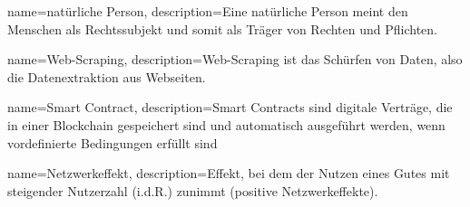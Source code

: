 {
name={natürliche Person},
description={\glqq Eine natürliche Person meint den Menschen als Rechtssubjekt und somit als Träger von Rechten und Pflichten.\grqq{} \cite{NatPerson_2018}}
}

{
name={Web-Scraping},
description={\glqq Web-Scraping ist das Schürfen von Daten, also die Datenextraktion aus Webseiten.\grqq{} \cite{webScraping_2021}}
}

{
name={Smart Contract},
description={\glqq Smart Contracts sind digitale Verträge, die in einer Blockchain gespeichert sind und automatisch ausgeführt werden, wenn vordefinierte Bedingungen erfüllt sind\grqq{} \cite{smartContract_2022}}
}

{
name={Netzwerkeffekt},
description={\glqq Effekt, bei dem der Nutzen eines Gutes mit steigender Nutzerzahl (i.d.R.) zunimmt (positive Netzwerkeffekte).\grqq{} \cite{Netzwerkeffekt_2018}}
}





